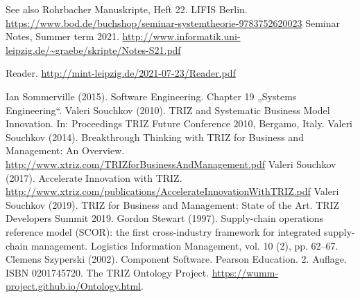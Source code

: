 \documentclass[11pt,a4paper]{article}
\begin{document}
\begin{thebibliography}{xxx}
  See also Rohrbacher Manuskripte, Heft 22. LIFIS Berlin.
  \url{https://www.bod.de/buchshop/seminar-systemtheorie-9783752620023}
 Seminar Notes, Summer term 2021.
  \url{http://www.informatik.uni-leipzig.de/~graebe/skripte/Notes-S21.pdf}
  
  Reader. \url{http://mint-leipzig.de/2021-07-23/Reader.pdf}
  
 Ian Sommerville (2015). Software Engineering.
  Chapter 19 „Systems Engineering“.
 Valeri Souchkov (2010). TRIZ and Systematic Business
  Model Innovation.  In: Proceedings TRIZ Future Conference 2010, Bergamo,
  Italy.
 Valeri Souchkov (2014). Breakthrough Thinking with TRIZ
  for Business and Management: An Overview.
  \url{http://www.xtriz.com/TRIZforBusinessAndManagement.pdf}
 Valeri Souchkov (2017). Accelerate Innovation with
  TRIZ.
  \url{http://www.xtriz.com/publications/AccelerateInnovationWithTRIZ.pdf}
 Valeri Souchkov (2019).  TRIZ for Business and
  Management: State of the Art.  TRIZ Developers Summit 2019.
 Gordon Stewart (1997). Supply-chain operations reference
  model (SCOR): the first cross-industry framework for integrated supply-chain
  management. Logistics Information Management, vol. 10 (2), pp. 62–67.
 Clemens Szyperski (2002). Component Software. Pearson
  Education.  2. Auf\-lage.  ISBN 0201745720.
 The TRIZ Ontology Project.
  \url{https://wumm-project.github.io/Ontology.html}.
\end{thebibliography}
\end{document}
